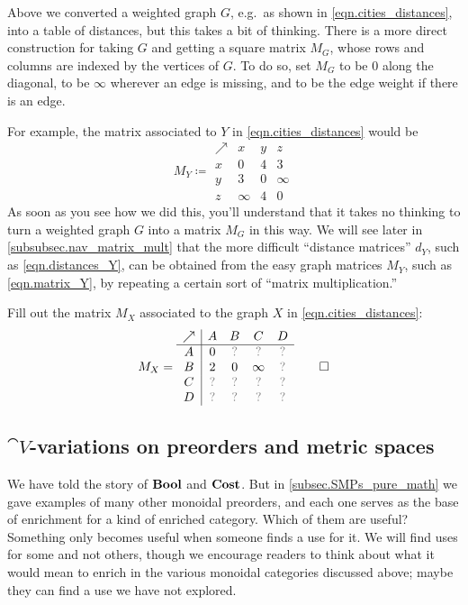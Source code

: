\documentclass[7Sketches]{subfiles}
\begin{document}
Above we converted a weighted graph $G$, e.g.\ as shown in \cref{eqn.cities_distances}, into a table of distances, but this takes a bit of thinking. There is a more direct construction for taking $G$ and getting a square matrix $M_G$, whose rows and columns are indexed by the vertices of $G$. To do so, set $M_G$ to be $0$ along the diagonal, to be $\infty$ wherever an edge is missing, and to be the edge weight if there is an edge.

For example, the matrix associated to $Y$ in \cref{eqn.cities_distances} would be
\begin{equation}%
\label{eqn.matrix_Y}
M_Y\coloneqq
\begin{array}{c|ccc}
  \nearrow&x&y&z\\\hline
  x & 0 & 4 & 3\\
  y & 3 & 0 & \infty\\
  z & \infty & 4 & 0
\end{array}
\end{equation}
As soon as you see how we did this, you'll understand that it takes no thinking
to turn a weighted graph $G$ into a matrix $M_G$ in this way. We will see later
in \cref{subsubsec.nav_matrix_mult} that the more difficult ``distance
matrices'' $d_Y$, such as \cref{eqn.distances_Y}, can be obtained from the easy
graph matrices $M_Y$, such as \cref{eqn.matrix_Y}, by repeating a certain sort of ``matrix multiplication.''

\begin{exercise}%
\label{exc.adjacency_matrix_X}%
Fill out the matrix $M_X$ associated to the graph $X$ in \cref{eqn.cities_distances}:
\[
M_X=
\begin{array}{c|cccc}
  \nearrow&A&B&C&D\\\hline
  A&0&\?&\?&\?\\
  B&2&0&\infty&\?\\
  C&\?&\?&\?&\?\\
  D&\?&\?&\?&\?
\end{array}
\qedhere
\]
\end{exercise}

\subsection{$\cat{V}$-variations on preorders and metric spaces}%
\label{subsec.variations_quantale}

We have told the story of $\mathbf{Bool}$ and $\mathbf{Cost}$. But in \cref{subsec.SMPs_pure_math} we gave examples of many other monoidal preorders, and each one serves as the base of enrichment for a kind of enriched category. Which of them are useful? Something only becomes useful when someone finds a use for it. We will find uses for some and not others, though we encourage readers to think about what it would mean to enrich in the various monoidal categories discussed above; maybe they can find a use we have not explored.
\end{document}
